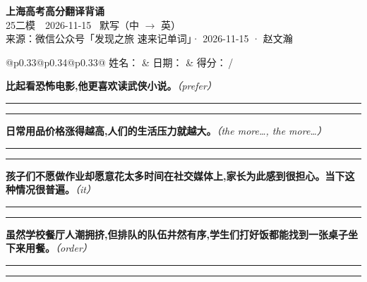 \documentclass[11pt,a4paper]{article}
\newcommand{\num}[1]{\makebox[1.9em][r]{#1.}\hspace{0.3em}}
\newcommand{\wline}{\noindent\rule{\linewidth}{0.4pt}}
\newcommand{\prompt}[1]{\emph{\textcolor{tipblue}{\small（#1）}}}
\begin{document}
\pagestyle{plain}
\begin{center}
{\LARGE\bfseries 上海高考高分翻译背诵 }\\[0.25em]
{\large 25二模　2026-11-15 \quad\ 默写（中 $\to$ 英）}\\[0.35em]
{\footnotesize 来源：微信公众号「发现之旅 速来记单词」· 2026-11-15 · 赵文瀚}
\end{center}

\vspace{0.4em}
\noindent\begin{tabular}{@{}p{0.33\textwidth}@{}p{0.34\textwidth}@{}p{0.33\textwidth}@{}}
姓名：\underline{\hspace{2.0cm}} & 日期：\underline{\hspace{2.0cm}} & 得分：\underline{\hspace{1.4cm}}\,/ \\
\end{tabular}

\vspace{0.5em}

\vspace{0.8em}
\num{1}\textbf{比起看恐怖电影,他更喜欢读武侠小说。}\prompt{prefer}

\vspace{0.3em}

\wline\vspace{0.3em}
\wline

\num{2}\textbf{日常用品价格涨得越高,人们的生活压力就越大。}\prompt{the more…, the more…}

\vspace{0.3em}

\wline\vspace{0.3em}
\wline

\num{3}\textbf{孩子们不愿做作业却愿意花太多时间在社交媒体上,家长为此感到很担心。当下这种情况很普遍。}\prompt{it}

\vspace{0.3em}

\wline\vspace{0.3em}
\wline

\num{4}\textbf{虽然学校餐厅人潮拥挤,但排队的队伍井然有序,学生们打好饭都能找到一张桌子坐下来用餐。}\prompt{order}

\vspace{0.3em}

\wline\vspace{0.3em}
\wline
\end{document}
